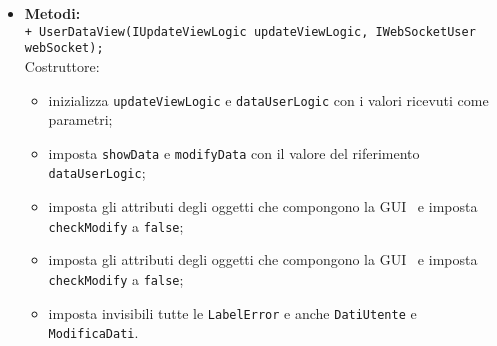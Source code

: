 {\begin{sloppypar}
{\begin{itemize}
\begin{itemize}
				\texttt{@UiField SimpleCheckBox BoxModifyCheck;}\\
				Controllo per attivare la modifica della password.\\

				\texttt{@UiField TextBox BoxNewPass;}\\
				Campo per l'inserimento della nuova password.\\

				\texttt{@UiField InlineLabel LabelNewError;}\\
				Label che contiene l’errore relativo al formato della nuova password errato.\\

				\texttt{@UiField TextBox BoxConfPass;}\\
				Campo per l'inserimento della password di conferma.\\

				\texttt{@UiField InlineLabel LabelConfPassError;}\\
				Label che contiene l’errore relativo alla non uguaglianza delle due password inserite.\\

				\texttt{@UiField PushButton ButtonConfermaSubmit;}\\
				Bottone di invio dei dati al Presenter per il controllo del formato e della loro conformità.\\

				\texttt{@UiField PushButton ButtonIndietroSubmit;}\\
				Bottone per passare al \texttt{CaptionPanel} \texttt{DatiUtente}.\\

			\item[] \textbf{Metodi:}\\
				\texttt{+ UserDataView(IUpdateViewLogic updateViewLogic, IWebSocketUser webSocket);}\\
				Costruttore:
				\begin{itemize}
					\item inizializza \texttt{updateViewLogic} e \texttt{dataUserLogic} con i valori ricevuti come parametri;
					\item imposta \texttt{showData} e \texttt{modifyData} con il valore del riferimento \texttt{dataUserLogic};
					\item imposta gli attributi degli oggetti che compongono la GUI\g~ e imposta \texttt{checkModify} a \texttt{false};
					\item imposta gli attributi degli oggetti che compongono la GUI\g~ e imposta \texttt{checkModify} a \texttt{false}; 
					\item imposta invisibili tutte le \texttt{LabelError} e anche \texttt{DatiUtente} e \texttt{ModificaDati}.
				\end{itemize}
				

\end{itemize}
\end{itemize}}
\end{sloppypar}}
